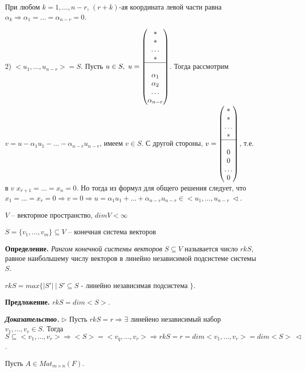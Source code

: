 При любом $k = 1, \dots, n-r$, $(r + k)$-ая координата левой части равна $\alpha_k \Rightarrow \alpha_1 = \dots = \alpha_{n-r} = 0$.

2) $<u_1, \dots, u_{n-r}> = S$. Пусть $u \in S, \ u = \begin{pmatrix} * \\ * \\ \dots \\ * \\ \hline
 \\ \alpha_1 \\ \alpha_2 \\ \dots \\ \alpha_{n-r} \end{pmatrix}$. Тогда рассмотрим $v = u - \alpha_1 u_1 - \dots - \alpha_{n-r} u_{n - r}$, имеем $v \in S$. С другой стороны, $v = \begin{pmatrix} * \\ * \\ \dots \\ * \\ \hline
 \\ 0 \\ 0 \\ \dots \\ 0 \end{pmatrix}$, т.е. в $v$ $x_{r+1} = \dots = x_n = 0$. Но тогда из формул для общего решения следует, что $x_1 = \dots = x_r = 0 \Rightarrow v = 0 \Rightarrow u = \alpha_1 u_1 + \dots + \alpha_{n-r} u _{n-r} \in <u_1, \dots, u_{n-r} \ \lhd$.

\bigskip
$V$ -- векторное пространство, $dimV < \infty$

$S = \{v_1, \dots, v_m\} \subseteq V$ -- конечная система векторов

\bigskip
\textbf{Определение.} \textit{Рангом конечной системы векторов} $S \subseteq V$  называется число $rkS$, равное наибольшему числу векторов в линейно независимой подсистеме системы $S$.

$rkS = max\{|S'| \ | \ S' \subseteq S$ - линейно независимая подсистема $\}$.

\bigskip
\textbf{Предложение.} $rkS = dim <S>$.

\bigskip
\textbf{\textit{Доказательство.}} $\rhd$ Пусть $rkS = r \Rightarrow \exists$ линейено независимый набор $v_1, \dots, v_r \in S$. Тогда $S \subseteq <v_1, \dots, v_r> \Rightarrow <S> = <v_q, \dots, v_r> \Rightarrow rkS = r = dim <v_1, \dots, v_r> = dim <S> \ \lhd$.

\bigskip
Пусть $A \in Mat_{m \times n} (F)$.

